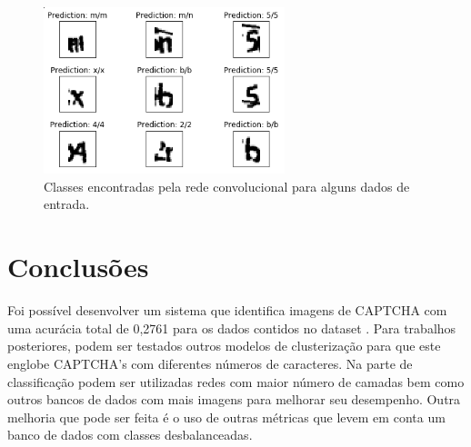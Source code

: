 \documentclass[11pt]{article}
\begin{document}
  \begin{figure}[H]
        {\centering
        \includegraphics[width=70mm]{images/pred.png}
        \caption{Classes encontradas pela rede convolucional para alguns dados de entrada.}
        \label{fig:learning}\par}
  \end{figure}


\section{Conclus\~{o}es}

Foi possível desenvolver um sistema que identifica imagens de CAPTCHA com uma acurácia total de 0,2761 para os dados contidos no dataset \cite{data}. Para trabalhos posteriores, podem ser testados outros modelos de clusterização para que este englobe CAPTCHA’s com diferentes números de caracteres. Na parte de classificação podem ser utilizadas redes com maior número de camadas bem como outros bancos de dados com mais imagens para melhorar seu desempenho. Outra melhoria que pode ser feita é o uso de outras métricas que levem em conta um banco de dados com classes desbalanceadas.

\nocite{15min} 
  

   
\end{document}

